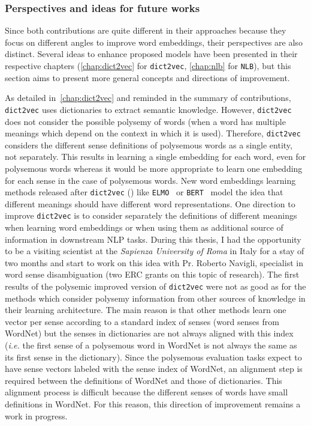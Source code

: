 \subsubsection{Perspectives and ideas for future works}
  Since both contributions are quite different in their approaches because they
  focus on different angles to improve word embeddings, their perspectives are
  also distinct. Several ideas to enhance proposed models have been presented in
  their respective chapters (\autoref{chap:dict2vec} for \texttt{dict2vec},
  \autoref{chap:nlb} for \texttt{NLB}), but this section aims to present more
  general concepts and directions of improvement. \medskip

  As detailed in~\autoref{chap:dict2vec} and reminded in the summary of
  contributions, \texttt{dict2vec} uses dictionaries to extract semantic
  knowledge. However, \texttt{dict2vec} does not consider the possible polysemy
  of words (when a word has multiple meanings which depend on the context in
  which it is used). Therefore, \texttt{dict2vec} considers the different sense
  definitions of polysemous words as a single entity, not separately. This
  results in learning a single embedding for each word, even for polysemous
  words whereas it would be more appropriate to learn one embedding for each
  sense in the case of polysemous words. New word embeddings learning methods
  released after \texttt{dict2vec} (\citeyear{tissier2017dict2vec}) like
  \texttt{ELMO}~\citep{peters2018elmo} or \texttt{BERT}~\citep{devlin2019bert}
  model the idea that different meanings should have different word
  representations. One direction to improve \texttt{dict2vec} is to consider
  separately the definitions of different meanings when learning word embeddings
  or when using them as additional source of information in downstream NLP
  tasks. During this thesis, I had the opportunity to be a visiting scientist at
  the \textit{Sapienza University of Roma} in Italy for a stay of two months and
  start to work on this idea with Pr. Roberto Navigli, specialist in word sense
  disambiguation (two ERC grants on this topic of research). The first results
  of the polysemic improved version of \texttt{dict2vec} were not as good as for
  the methods which consider polysemy information from other sources of
  knowledge in their learning architecture. The main reason is that other
  methods learn one vector per sense according to a standard index of senses
  (word senses from WordNet) but the senses in dictionaries are not always
  aligned with this index (\textit{i.e.} the first sense of a polysemous word in
  WordNet is not always the same as its first sense in the dictionary). Since
  the polysemous evaluation tasks expect to have sense vectors labeled with the
  sense index of WordNet, an alignment step is required between the definitions
  of WordNet and those of dictionaries. This alignment process is difficult
  because the different senses of words have small definitions in WordNet. For
  this reason, this direction of improvement remains a work in progress.
  \medskip

